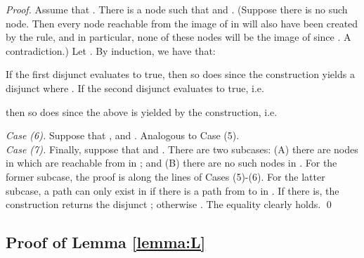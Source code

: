 \documentclass{llncs}
\begin{document}
\begin{proof}
	
		Assume that . There is a node  such that  and . (Suppose there is no such node. Then every node reachable from the image of  in  will also have been created by the rule, and in particular, none of these nodes will be the image of  since . A contradiction.) Let . By induction, we have that:
		
		
		\noindent If the first disjunct evaluates to true, then so does  since the construction yields a disjunct  where . If the second disjunct evaluates to true, i.e.\
		
		
		\noindent then so does  since the above is yielded by the construction, i.e.
		
		
		
		\noindent \emph{Case (6).} Suppose that , and . Analogous to Case (5). \\
		
		\noindent \emph{Case (7).} Finally, suppose that  and . There are two subcases: (A) there are nodes in  which are reachable from  in ; and (B) there are no such nodes in . For the former subcase, the proof is along the lines of Cases (5)-(6). For the latter subcase, a path can only exist in  if there is a path from  to  in . If there is, the construction returns the disjunct ; otherwise . The equality clearly holds.
		\qed
	\end{proof}
	
	
	
	
	
	
	
	
	
	
	
	
	
	\newpage
	\subsection{Proof of Lemma \ref{lemma:L}}\label{lemma:L:PROOF}
	
\end{document}
